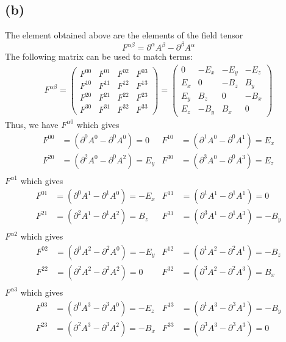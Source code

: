 \documentclass[11pt]{article}
\begin{document}
\subsection*{(b)}
The element obtained above are the elements of the field tensor
$$
F^{\alpha \beta} = \partial^{\alpha}A^{\beta} - \partial^{\beta}A^{\alpha}
$$
The following matrix can be used to match terms:
\begin{align*}
F^{\alpha \beta} = 
\left(\begin{array}{llll}
F^{00} & F^{01} & F^{02} & F^{03} \\
F^{10} & F^{11} & F^{12} & F^{13} \\
F^{20} & F^{21} & F^{22} & F^{23} \\
F^{30} & F^{31} & F^{32} & F^{33}
\end{array}\right)
= 
\begin{pmatrix}
    0 & -E_{x} & -E_{y} & -E_{z} \\
    E_{x} & 0 & -B_{z} & B_{y} \\
    E_{y} & B_{z} & 0 & -B_{x} \\
    E_{z} & -B_{y} & B_{x} & 0
\end{pmatrix}
\end{align*}
Thus, we have $F^{\alpha 0}$ which gives
\begin{align*}
F^{00} &= (\partial^{0} A^{0} - \partial^{0}A^{0}) = 0 &
F^{10} &= (\partial^{1} A^{0} - \partial^{0}A^{1}) = E_{x} \\
F^{20} &= (\partial^{2} A^{0} - \partial^{0}A^{2}) = E_{y} &
F^{30} &= (\partial^{3} A^{0} - \partial^{0}A^{3}) = E_{z} \\
\end{align*}
$F^{\alpha 1}$ which gives
\begin{align*}
F^{01} &= (\partial^{0} A^{1} - \partial^{1}A^{0}) = -E_{x} &
F^{11} &= (\partial^{1} A^{1} - \partial^{1}A^{1}) = 0 \\
F^{21} &= (\partial^{2} A^{1} - \partial^{1}A^{2}) = B_{z} &
F^{31} &= (\partial^{3} A^{1} - \partial^{1}A^{3}) = -B_{y} \\
\end{align*}
$F^{\alpha 2}$ which gives
\begin{align*}
F^{02} &= (\partial^{0} A^{2} - \partial^{2}A^{0}) = -E_{y} &
F^{12} &= (\partial^{1} A^{2} - \partial^{2}A^{1}) = -B_{z} \\
F^{22} &= (\partial^{2} A^{2} - \partial^{2}A^{2}) = 0 &
F^{32} &= (\partial^{3} A^{2} - \partial^{2}A^{3}) = B_{x} \\
\end{align*}
$F^{\alpha 3}$ which gives
\begin{align*}
F^{03} &= (\partial^{0} A^{3} - \partial^{3}A^{0}) = -E_{z} &
F^{13} &= (\partial^{1} A^{3} - \partial^{3}A^{1}) = -B_{y} \\
F^{23} &= (\partial^{2} A^{3} - \partial^{3}A^{2}) = -B_{x} &
F^{33} &= (\partial^{3} A^{3} - \partial^{3}A^{3}) = 0 \\
\end{align*}
\end{document}
